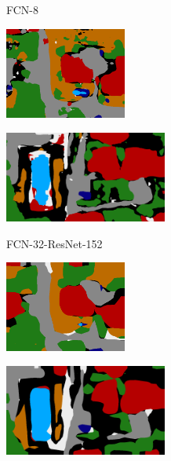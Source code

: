 \begin{figure}[ht!]
  \begin{subfigure}[c]{0.20\textwidth}
    \centering FCN-8
  \end{subfigure}
  \begin{subfigure}[c]{0.33\textwidth}
    \includegraphics[height=3cm]{images/part4/swi_fcn8.png}
  \end{subfigure}
  \begin{subfigure}[c]{0.45\textwidth}
    \includegraphics[height=3cm]{images/part4/oku_fcn8.png}
  \end{subfigure}
  \vspace{0.1cm}
  
  \begin{subfigure}[c]{0.20\textwidth}
    \centering FCN-32-ResNet-152
  \end{subfigure}
  \begin{subfigure}[c]{0.33\textwidth}
    \includegraphics[height=3cm]{images/part4/swi_152.png}
  \end{subfigure}
  \begin{subfigure}[c]{0.45\textwidth}
    \includegraphics[height=3cm]{images/part4/oku_152.png}
  \end{subfigure}
  \vspace{0.1cm}
  

\end{figure}
